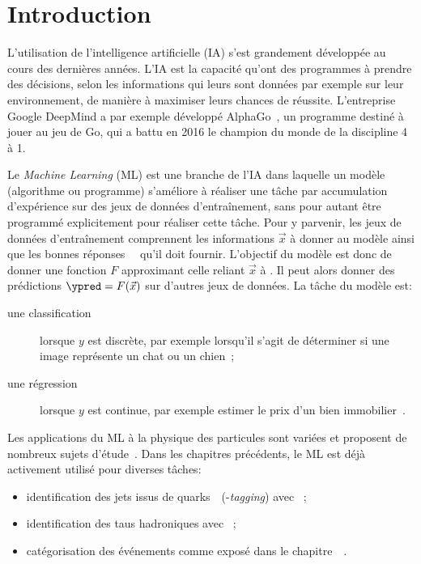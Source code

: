 \section{Introduction}\label{chapter-ML-section-intro}
L'utilisation de l'intelligence artificielle (IA) s'est grandement développée au cours des dernières années.
L'IA est la capacité qu'ont des programmes à prendre des décisions, selon les informations qui leurs sont données par exemple sur leur environnement, de manière à maximiser leurs chances de réussite.
L'entreprise Google DeepMind a par exemple développé AlphaGo~\cite{alphago},
un programme destiné à jouer au jeu de Go,
qui a battu en 2016 le champion du monde de la discipline 4 à 1.
\par
Le \emph{Machine Learning} (ML) est une branche de l'IA
dans laquelle un modèle (algorithme ou programme) s'améliore à réaliser une tâche par
accumulation d'expérience sur des jeux de données d'entraînement,
sans pour autant être programmé explicitement pour réaliser cette tâche.
Pour y parvenir,
les jeux de données d'entraînement comprennent les informations $\vec{x}$ à donner au modèle
ainsi que les \og bonnes réponses \fg\ \ytrue\ qu'il doit fournir.
L'objectif du modèle est donc de donner une fonction $F$ approximant celle reliant $\vec{x}$ à \ytrue.
Il peut alors donner des prédictions $\ypred=F(\vec{x})$ sur d'autres jeux de données.
La tâche du modèle est:
\begin{description}
\item[une classification] lorsque $y$ est discrète, par exemple lorsqu'il s'agit de déterminer si une image représente un chat ou un chien~\cite{datafrog_img_reco};
\item[une régression] lorsque $y$ est continue, par exemple estimer le prix d'un bien immobilier~\cite{house_prices_regression}.
\end{description}
\par
Les applications du ML à la physique des particules sont variées et proposent de nombreux sujets d'étude~\cite{Gael_thesis,scham_moritz_2020_21993,kopf_tanja_2019_21500,Baldi_2015}.
Dans les chapitres précédents, le ML est déjà activement utilisé pour diverses tâches:
\begin{itemize}
\item identification des jets issus de quarks~\quarkb\ (\quarkb-\emph{tagging}) avec \DeepCSV~\cite{jet_flavor_deep_nn,Sirunyan_heavy_flavor_jets_2018,DeepJet};
\item identification des taus hadroniques avec \DEEPTAU~\cite{CMS-DP-2019-033};
\item catégorisation des événements comme exposé dans le chapitre~~\cite{CMS-NOTE-2019-177,CMS-NOTE-2019-178}.
\end{itemize}

